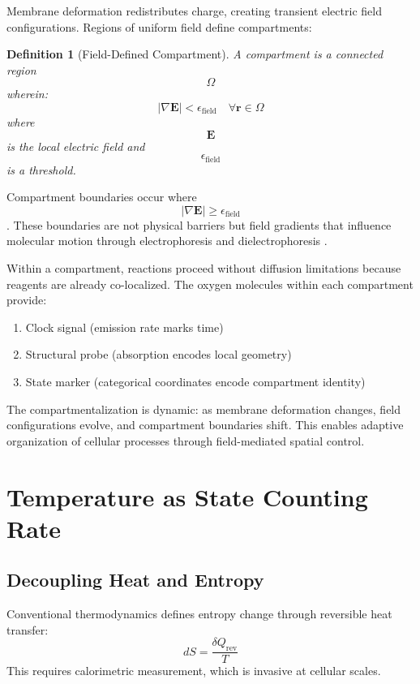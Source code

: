 \documentclass[twocolumn,10pt]{article}
\newtheorem{definition}[theorem]{Definition}
\begin{document}
Membrane deformation redistributes charge, creating transient electric field configurations. Regions of uniform field define compartments:

\begin{definition}[Field-Defined Compartment]
A compartment is a connected region $$\Omega$$ wherein:
\begin{equation}
|\nabla \mathbf{E}| < \epsilon_{\text{field}} \quad \forall \mathbf{r} \in \Omega
\end{equation}
where $$\mathbf{E}$$ is the local electric field and $$\epsilon_{\text{field}}$$ is a threshold.
\end{definition}

Compartment boundaries occur where $$|\nabla \mathbf{E}| \geq \epsilon_{\text{field}}$$. These boundaries are not physical barriers but field gradients that influence molecular motion through electrophoresis and dielectrophoresis \cite{Pohl1978}.

Within a compartment, reactions proceed without diffusion limitations because reagents are already co-localized. The oxygen molecules within each compartment provide:
\begin{enumerate}
\item Clock signal (emission rate marks time)
\item Structural probe (absorption encodes local geometry)
\item State marker (categorical coordinates encode compartment identity)
\end{enumerate}

The compartmentalization is dynamic: as membrane deformation changes, field configurations evolve, and compartment boundaries shift. This enables adaptive organization of cellular processes through field-mediated spatial control.



\section{Temperature as State Counting Rate}

\subsection{Decoupling Heat and Entropy}

Conventional thermodynamics defines entropy change through reversible heat transfer:
\begin{equation}
dS = \frac{\delta Q_{\text{rev}}}{T}
\end{equation}
This requires calorimetric measurement, which is invasive at cellular scales.
\end{document}

